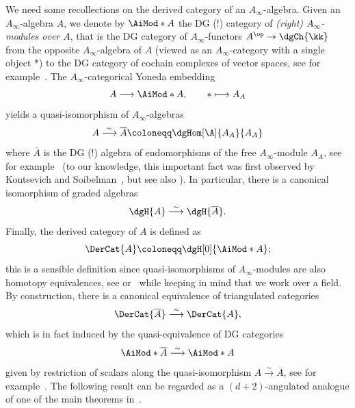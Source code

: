 \documentclass[a4paper]{amsart}
\begin{document}
We need some recollections on the derived category of an $A_\infty$-algebra.
Given an $A_\infty$-algebra $A$, we denote by $\AiMod*{A}$ the DG (!) category
of \emph{(right) $A_\infty$-modules over $A$}, that is the DG category of
$A_\infty$-functors $A^\op\to\dgCh{\kk}$ from the opposite $A_\infty$-algebra of
$A$ (viewed as an $A_\infty$-category with a single object $*$) to the DG
category of cochain complexes of vector spaces, see for
example~\cite[Sec.~I.1j]{Sei08}. The $A_\infty$-categorical Yoneda embedding
\[
  A\longrightarrow\AiMod*{A},\qquad *\longmapsto A_A
\]
yields a quasi-isomorphism of $A_\infty$-algebras
\[
  A\stackrel{\sim}{\longrightarrow}\overline{A}\coloneqq\dgHom[\A]{A_A}{A_A}
\]
where $\overline{A}$ is the DG (!) algebra of endomorphisms of the free
$A_\infty$-module $A_A$, see for example~\cite[Sec.~I.2g]{Sei08} (to our
knowledge, this important fact was first observed by Kontsevich and
Soibelman~\cite[Sec.~6.2]{KS06}, but see also \cite[Sec.~7.5]{Lef03}). In particular, there is a canonical
isomorphism of graded algebras
\[
  \dgH{A}\stackrel{\sim}{\longrightarrow}\dgH{\overline{A}}.
\]
Finally, the derived category of $A$ is defined as
\[
  \DerCat{A}\coloneqq\dgH[0]{\AiMod*{A}};
\]
this is a sensible definition since quasi-isomorphisms of $A_\infty$-modules are
also homotopy equivalences, see \cite[Sec.~4]{Kel01}
or~\cite[Thm.~4.1.3.1]{Lef03} while keeping in mind that we work over a field.
By construction, there is a canonical equivalence of triangulated categories
\[
  \DerCat{\overline{A}}\stackrel{\sim}{\longrightarrow}\DerCat{A},
\]
which is in fact induced by the quasi-equivalence of DG categories
\[
  \AiMod*{\overline{A}}\stackrel{\sim}{\longrightarrow}\AiMod*{A}
\]
given by restriction of scalars along the quasi-isomorphism
$A\stackrel{\sim}{\to}\overline{A}$, see for example~\cite[Lemma~I.2.10]{Sei08}.
The following result can be regarded as a $(d+2)$-angulated analogue of one of
the main theorems in~\cite{Mur22}.
\end{document}
